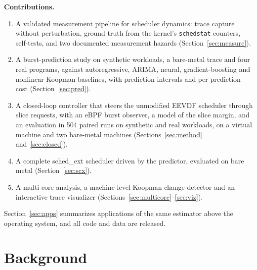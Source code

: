 \documentclass[conference,onecolumn,11pt]{IEEEtran}
\begin{document}
\textbf{Contributions.}
\begin{enumerate}
\item A validated measurement pipeline for scheduler dynamics: trace capture without perturbation, ground truth from the kernel's \texttt{schedstat} counters, self-tests, and two documented measurement hazards (Section~\ref{sec:measure}).
\item A burst-prediction study on synthetic workloads, a bare-metal trace and four real programs, against autoregressive, ARIMA, neural, gradient-boosting and nonlinear-Koopman baselines, with prediction intervals and per-prediction cost (Section~\ref{sec:pred}).
\item A closed-loop controller that steers the unmodified EEVDF scheduler through slice requests, with an eBPF burst observer, a model of the slice margin, and an evaluation in 504 paired runs on synthetic and real workloads, on a virtual machine and two bare-metal machines (Sections~\ref{sec:method} and~\ref{sec:closed}).
\item A complete sched\_ext scheduler driven by the predictor, evaluated on bare metal (Section~\ref{sec:scx}).
\item A multi-core analysis, a machine-level Koopman change detector and an interactive trace visualizer (Sections~\ref{sec:multicore}--\ref{sec:viz}).
\end{enumerate}
Section~\ref{sec:apps} summarizes applications of the same estimator above the operating system, and all code and data are released.

\section{Background}
\end{document}
